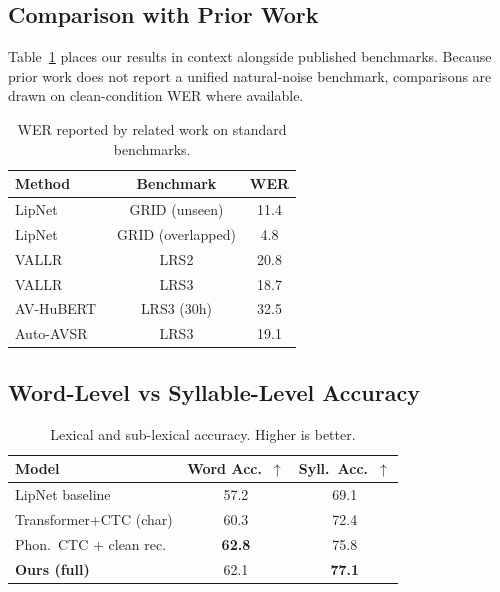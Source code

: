 \documentclass[10pt,twocolumn,letterpaper]{article}
\begin{document}
\subsection{Comparison with Prior Work}
Table~\ref{tab:reported-anchors} places our results in context alongside published benchmarks. Because prior work does not report a unified natural-noise benchmark, comparisons are drawn on clean-condition WER where available.

\begin{table}[t]
\centering
\small
\caption{WER reported by related work on standard benchmarks.}
\label{tab:reported-anchors}
\begin{tabular}{lcc}
\toprule
Method & Benchmark & WER \\
\midrule
LipNet~\cite{assael2016lipnet} & GRID (unseen)     & 11.4 \\
LipNet~\cite{assael2016lipnet} & GRID (overlapped) & 4.8  \\
VALLR~\cite{thomas2025vallr}   & LRS2              & 20.8 \\
VALLR~\cite{thomas2025vallr}   & LRS3              & 18.7 \\
AV-HuBERT~\cite{shi2022avhubert} & LRS3 (30h)      & 32.5 \\
Auto-AVSR~\cite{ma2023autoavsr}  & LRS3             & 19.1 \\
\bottomrule
\end{tabular}
\end{table}

\subsection{Word-Level vs Syllable-Level Accuracy}
\begin{table}[t]
\centering
\small
\caption{Lexical and sub-lexical accuracy. Higher is better.}
\label{tab:word-syllable}
\begin{tabular}{lcc}
\toprule
Model & Word Acc.\ $\uparrow$ & Syll.\ Acc.\ $\uparrow$ \\
\midrule
LipNet baseline        & 57.2          & 69.1 \\
Transformer+CTC (char) & 60.3          & 72.4 \\
Phon.\ CTC + clean rec.\ & \textbf{62.8} & 75.8 \\
\textbf{Ours (full)}   & 62.1          & \textbf{77.1} \\
\bottomrule
\end{tabular}
\end{table}
\end{document}
